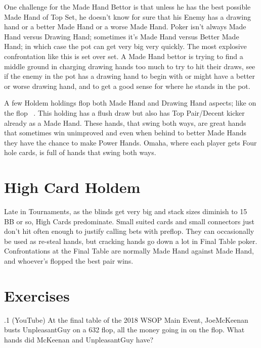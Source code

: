 One challenge for the Made Hand Bettor is that unless he has the best
possible Made Hand of Top Set, he doesn't know for sure that his
Enemy has a drawing hand or a better Made Hand or a worse Made
Hand. Poker isn't always Made Hand versus Drawing Hand; sometimes it's
Made Hand versus Better Made Hand; in which case the pot can get very
big very quickly. The most explosive confrontation like this is set
over set. A Made Hand bettor is trying to find a middle ground in
charging drawing hands too much to try to hit their draws, see if the
enemy in the pot has a drawing hand to begin with or might have a
better or worse drawing hand, and to get a good sense for where he
stands in the pot.

A few Holdem holdings flop both Made Hand and Drawing Hand aspects;
like \Kh\tenh on the flop \Kc\nineh\eigh\ . This holding has a flush
draw but also has Top Pair/Decent kicker already as a Made Hand. These
hands, that swing both ways, are great hands that sometimes win
unimproved and even when behind to better Made Hands they have the
chance to make Power Hands. Omaha, where each player gets Four hole
cards, is full of hands that swing both ways.

\section{High Card Holdem}

Late in Tournaments, as the blinds get very big and stack sizes diminish
to 15 BB or so, High Cards predominate. Small suited cards and small
connectors just don't hit often enough to justify calling bets with
preflop. They can occasionally be used as re-steal hands, but cracking
hands go down a lot in Final Table poker. Confrontations at the Final
Table are normally Made Hand against Made Hand, and whoever's flopped
the best pair wins.

\section{Exercises}


.1 (YouTube) At the final table of the 2018 WSOP Main
Event, JoeMcKeenan busts UnpleasantGuy on a 632 flop, all the money
going in on the flop. What hands did McKeenan and UnpleasantGuy have?
